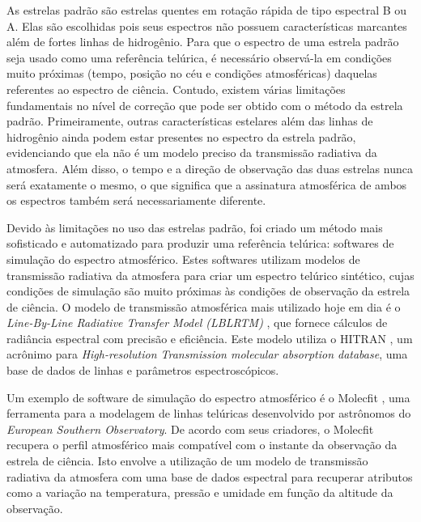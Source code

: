 As estrelas padrão são estrelas quentes em rotação rápida de tipo espectral B ou A. Elas são escolhidas pois seus espectros não possuem características marcantes além de fortes linhas de hidrogênio. Para que o espectro de uma estrela padrão seja usado como uma referência telúrica, é necessário observá-la em condições muito próximas (tempo, posição no céu e condições atmosféricas) daquelas referentes ao espectro de ciência. Contudo, existem várias limitações fundamentais no nível de correção que pode ser obtido com o método da estrela padrão. Primeiramente, outras características estelares além das linhas de hidrogênio ainda podem estar presentes no espectro da estrela padrão, evidenciando que ela não é um modelo preciso da transmissão radiativa da atmosfera. Além disso, o tempo e a direção de observação das duas estrelas nunca será exatamente o mesmo, o que significa que a assinatura atmosférica de ambos os espectros também será necessariamente diferente.

Devido às limitações no uso das estrelas padrão, foi criado um método mais sofisticado e automatizado para produzir uma referência telúrica: softwares de simulação do espectro atmosférico. Estes softwares utilizam modelos de transmissão radiativa da atmosfera para criar um espectro telúrico sintético, cujas condições de simulação são muito próximas às condições de observação da estrela de ciência. O modelo de transmissão atmosférica mais utilizado hoje em dia é o \textit{Line-By-Line Radiative Transfer Model (LBLRTM)} \citep{2005JQSRT..91..233C}, que fornece cálculos de radiância espectral com precisão e eficiência. Este modelo utiliza o HITRAN \citep{rothman2009hitran}, um acrônimo para \textit{High-resolution Transmission molecular absorption database}, uma base de dados de linhas e parâmetros espectroscópicos. 

Um exemplo de software de simulação do espectro atmosférico é o Molecfit \citep{smette2015molecfit}, uma ferramenta para a modelagem de linhas telúricas desenvolvido por astrônomos do \textit{European Southern Observatory}. De acordo com seus criadores, o Molecfit recupera o perfil atmosférico mais compatível com o instante da observação da estrela de ciência. Isto envolve a utilização de um modelo de transmissão radiativa da atmosfera com uma base de dados espectral para recuperar atributos como a variação na temperatura, pressão e umidade em função da altitude da observação.

